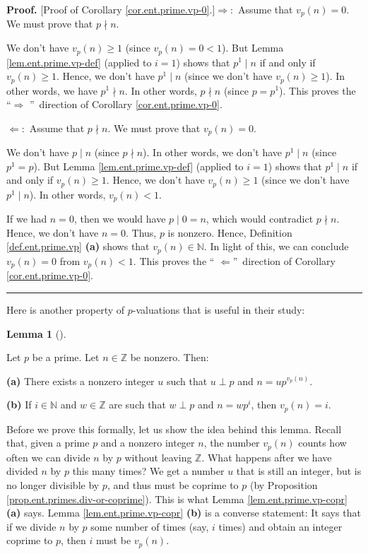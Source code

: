 \documentclass[numbers=enddot,12pt,final,onecolumn,notitlepage]{scrartcl}%
\numberwithin{exer}{subsection}
\theoremstyle{definition}
\newtheorem{lem}[theo]{Lemma}
\newenvironment{lemma}[1][]
{\begin{lem}[#1]\begin{leftbar}}
{\end{leftbar}\end{lem}}
\newenvironment{proof}[1][Proof]{\noindent\textbf{#1.} }{\ \rule{0.5em}{0.5em}}
\begin{document}
\begin{proof}
[Proof of Corollary \ref{cor.ent.prime.vp-0}.]$\Longrightarrow:$ Assume that
$v_{p}\left(  n\right)  =0$. We must prove that $p\nmid n$.

We don't have $v_{p}\left(  n\right)  \geq1$ (since $v_{p}\left(  n\right)
=0<1$). But Lemma \ref{lem.ent.prime.vp-def} (applied to $i=1$) shows that
$p^{1}\mid n$ if and only if $v_{p}\left(  n\right)  \geq1$. Hence, we don't
have $p^{1}\mid n$ (since we don't have $v_{p}\left(  n\right)  \geq1$). In
other words, we have $p^{1}\nmid n$. In other words, $p\nmid n$ (since
$p=p^{1}$). This proves the \textquotedblleft$\Longrightarrow$%
\textquotedblright\ direction of Corollary \ref{cor.ent.prime.vp-0}.

$\Longleftarrow:$ Assume that $p\nmid n$. We must prove that $v_{p}\left(
n\right)  =0$.

We don't have $p\mid n$ (since $p\nmid n$). In other words, we don't have
$p^{1}\mid n$ (since $p^{1}=p$). But Lemma \ref{lem.ent.prime.vp-def} (applied
to $i=1$) shows that $p^{1}\mid n$ if and only if $v_{p}\left(  n\right)
\geq1$. Hence, we don't have $v_{p}\left(  n\right)  \geq1$ (since we don't
have $p^{1}\mid n$). In other words, $v_{p}\left(  n\right)  <1$.

If we had $n=0$, then we would have $p\mid0=n$, which would contradict $p\nmid
n$. Hence, we don't have $n=0$. Thus, $p$ is nonzero. Hence, Definition
\ref{def.ent.prime.vp} \textbf{(a)} shows that $v_{p}\left(  n\right)
\in\mathbb{N}$. In light of this, we can conclude $v_{p}\left(  n\right)  =0$
from $v_{p}\left(  n\right)  <1$. This proves the \textquotedblleft%
$\Longleftarrow$\textquotedblright\ direction of Corollary
\ref{cor.ent.prime.vp-0}.
\end{proof}

Here is another property of $p$-valuations that is useful in their study:

\begin{lemma}
\label{lem.ent.prime.vp-copr}Let $p$ be a prime. Let $n\in\mathbb{Z}$ be
nonzero. Then:

\textbf{(a)} There exists a nonzero integer $u$ such that $u\perp p$ and
$n=up^{v_{p}\left(  n\right)  }$.

\textbf{(b)} If $i\in\mathbb{N}$ and $w\in\mathbb{Z}$ are such that $w\perp p$
and $n=wp^{i}$, then $v_{p}\left(  n\right)  =i$.
\end{lemma}

Before we prove this formally, let us show the idea behind this lemma. Recall
that, given a prime $p$ and a nonzero integer $n$, the number $v_{p}\left(
n\right)  $ counts how often we can divide $n$ by $p$ without leaving
$\mathbb{Z}$. What happens after we have divided $n$ by $p$ this many times?
We get a number $u$ that is still an integer, but is no longer divisible by
$p$, and thus must be coprime to $p$ (by Proposition
\ref{prop.ent.primes.div-or-coprime}). This is what Lemma
\ref{lem.ent.prime.vp-copr} \textbf{(a)} says. Lemma
\ref{lem.ent.prime.vp-copr} \textbf{(b)} is a converse statement: It says that
if we divide $n$ by $p$ some number of times (say, $i$ times) and obtain an
integer coprime to $p$, then $i$ must be $v_{p}\left(  n\right)  $.
\end{document}
